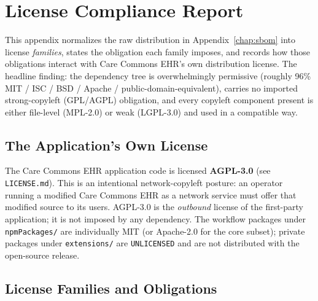 \chapter{License Compliance Report}
\label{chap:license-compliance}

This appendix normalizes the raw distribution in Appendix~\ref{chap:sbom}
into license \emph{families}, states the obligation each family imposes, and
records how those obligations interact with Care Commons EHR's own
distribution license. The headline finding: the dependency tree is overwhelmingly
permissive (roughly 96\% MIT / ISC / BSD / Apache / public-domain-equivalent),
carries no imported strong-copyleft (GPL/AGPL) obligation, and every
copyleft component present is either file-level (MPL-2.0) or weak
(LGPL-3.0) and used in a compatible way.

\section{The Application's Own License}

The Care Commons EHR application code is licensed \textbf{AGPL-3.0} (see
\texttt{LICENSE.md}). This is an intentional network-copyleft posture: an
operator running a modified Care Commons EHR as a network service must offer
that modified source to its users. AGPL-3.0 is the \emph{outbound} license of
the first-party application; it is not imposed by any dependency. The workflow
packages under \texttt{npmPackages/} are individually MIT (or Apache-2.0 for
the core subset); private packages under \texttt{extensions/} are
\texttt{UNLICENSED} and are not distributed with the open-source release.

\section{License Families and Obligations}


